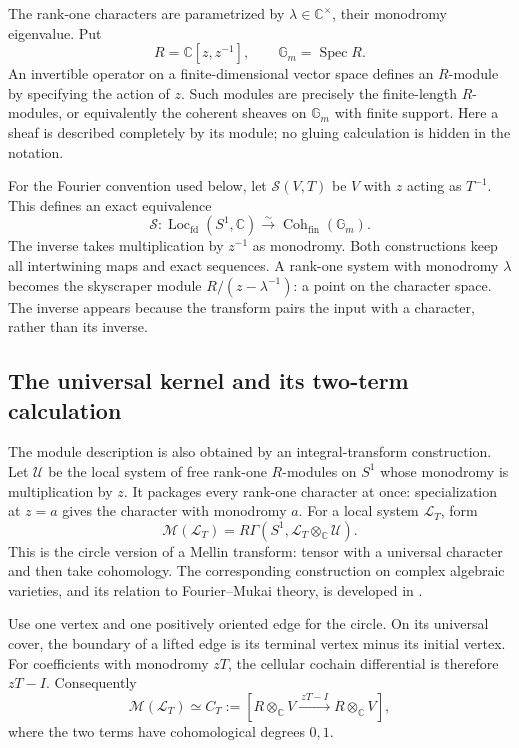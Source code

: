 \documentclass[11pt]{article}
\theoremstyle{remark}
\newcommand{\C}{\mathbb C}
\newcommand{\Spec}{\operatorname{Spec}}
\begin{document}
The rank-one characters are parametrized by \(\lambda\in\C^\times\), their monodromy eigenvalue. Put
\[
R=\C[z,z^{-1}],\qquad \mathbb G_m=\Spec R.
\]
An invertible operator on a finite-dimensional vector space defines an \(R\)-module by specifying the action of \(z\). Such modules are precisely the finite-length \(R\)-modules, or equivalently the coherent sheaves on \(\mathbb G_m\) with finite support. Here a sheaf is described completely by its module; no gluing calculation is hidden in the notation.

For the Fourier convention used below, let \(\mathcal S(V,T)\) be \(V\) with \(z\) acting as \(T^{-1}\). This defines an exact equivalence
\begin{equation}
\mathcal S:\operatorname{Loc}_{\mathrm{fd}}(S^1,\C)
\overset{\sim}{\longrightarrow}
\operatorname{Coh}_{\mathrm{fin}}(\mathbb G_m).
\label{circle:equivalence}
\end{equation}
The inverse takes multiplication by \(z^{-1}\) as monodromy. Both constructions keep all intertwining maps and exact sequences. A rank-one system with monodromy \(\lambda\) becomes the skyscraper module \(R/(z-\lambda^{-1})\): a point on the character space. The inverse appears because the transform pairs the input with a character, rather than its inverse.

\subsection{The universal kernel and its two-term calculation}

The module description is also obtained by an integral-transform construction. Let \(\mathcal U\) be the local system of free rank-one \(R\)-modules on \(S^1\) whose monodromy is multiplication by \(z\). It packages every rank-one character at once: specialization at \(z=a\) gives the character with monodromy \(a\). For a local system \(\mathcal L_T\), form
\[
\mathcal M(\mathcal L_T)
=R\Gamma(S^1,\mathcal L_T\otimes_{\C}\mathcal U).
\]
This is the circle version of a Mellin transform: tensor with a universal character and then take cohomology. The corresponding construction on complex algebraic varieties, and its relation to Fourier--Mukai theory, is developed in \cite{liu-maxim-wang-mellin}.

Use one vertex and one positively oriented edge for the circle. On its universal cover, the boundary of a lifted edge is its terminal vertex minus its initial vertex. For coefficients with monodromy \(zT\), the cellular cochain differential is therefore \(zT-I\). Consequently
\begin{equation}
\mathcal M(\mathcal L_T)
\simeq C_T:=[R\otimes_{\C}V
\xrightarrow{\ zT-I\ }R\otimes_{\C}V],
\label{circle:complex}
\end{equation}
where the two terms have cohomological degrees \(0,1\).
\end{document}

